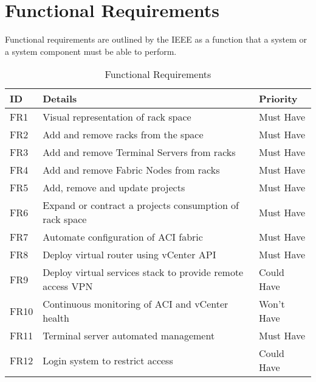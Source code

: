 \section{Functional Requirements}
Functional requirements are outlined by the IEEE as a function that a system or a system component must be able to perform. \citep{159342}
\label{requirements:functional}
\begin{center}
    \begin{table}[H]
        \begin{tabular}{l l l}
            \hline
            \textbf{ID} & \textbf{Details}
                        & \textbf{Priority}
            \\ \hline
            FR1         & Visual representation of rack space
                        & Must Have
            \\ \hline
            FR2         & Add and remove racks from the space
                        & Must Have
            \\ \hline
            FR3         & Add and remove Terminal Servers from racks
                        & Must Have
            \\ \hline
            FR4         & Add and remove Fabric Nodes from racks
                        & Must Have
            \\ \hline
            FR5         & Add, remove and update projects
                        & Must Have
            \\ \hline
            FR6         & Expand or contract a projects consumption of rack
            space       & Must Have
            \\ \hline
            FR7         & Automate configuration of ACI fabric
                        & Must Have
            \\ \hline
            FR8         & Deploy virtual router using vCenter API
                        & Must Have
            \\ \hline
            FR9         & Deploy virtual services stack to provide remote
            access VPN  & Could
            Have
            \\ \hline
            FR10        & Continuous monitoring of ACI and vCenter health
                        & Won’t Have
            \\
            \hline
            FR11        & Terminal server automated management
                        & Must Have
            \\ \hline
            FR12        & Login system to restrict access                   & 
            Could Have                                                         \\
        \end{tabular}
        \caption{Functional Requirements}
    \end{table}
\end{center}

